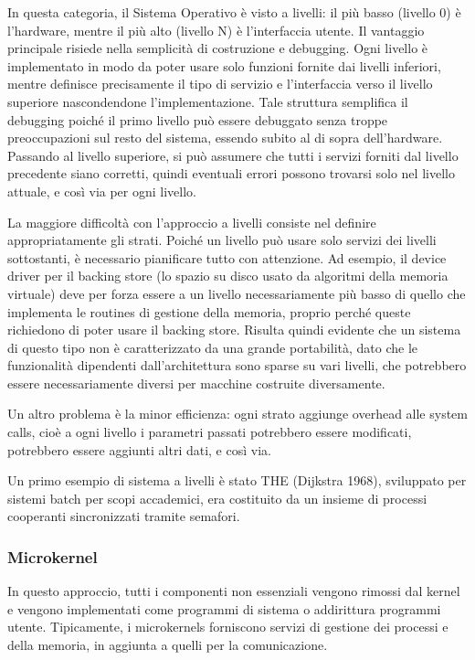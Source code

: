 \documentclass[a4paper]{article}
\begin{document}
In questa categoria, il Sistema Operativo è visto a livelli: il più basso (livello 0) è l'hardware, mentre il più alto (livello N) è l'interfaccia utente.
Il vantaggio principale risiede nella semplicità di costruzione e debugging. Ogni livello è implementato in modo da poter usare solo funzioni fornite dai livelli inferiori, mentre definisce precisamente il tipo di servizio e l'interfaccia verso il livello superiore nascondendone l'implementazione. Tale struttura semplifica il debugging poiché il primo livello può essere debuggato senza troppe preoccupazioni sul resto del sistema, essendo subito al di sopra dell'hardware. Passando al livello superiore, si può assumere che tutti i servizi forniti dal livello precedente siano corretti, quindi eventuali errori possono trovarsi solo nel livello attuale, e così via per ogni livello.

La maggiore difficoltà con l'approccio a livelli consiste nel definire appropriatamente gli strati. Poiché un livello può usare solo servizi dei livelli sottostanti, è necessario pianificare tutto con attenzione. Ad esempio, il device driver per il backing store (lo spazio su disco usato da algoritmi della memoria virtuale) deve per forza essere a un livello necessariamente più basso di quello che implementa le routines di gestione della memoria, proprio perché queste richiedono di poter usare il backing store. Risulta quindi evidente che un sistema di questo tipo non è caratterizzato da una grande portabilità, dato che le funzionalità dipendenti dall'architettura sono sparse su vari livelli, che potrebbero essere necessariamente diversi per macchine costruite diversamente.

Un altro problema è la minor efficienza: ogni strato aggiunge overhead alle system calls, cioè a ogni livello i parametri passati potrebbero essere modificati, potrebbero essere aggiunti altri dati, e così via.

Un primo esempio di sistema a livelli è stato THE (Dijkstra 1968), sviluppato per sistemi batch per scopi accademici, era costituito da un insieme di processi cooperanti sincronizzati tramite semafori.

\subsubsection{Microkernel}
In questo approccio, tutti i componenti non essenziali vengono rimossi dal kernel e vengono implementati come programmi di sistema o addirittura programmi utente. Tipicamente, i microkernels forniscono servizi di gestione dei processi e della memoria, in aggiunta a quelli per la comunicazione.
\end{document}
